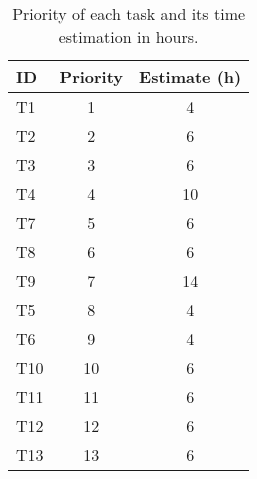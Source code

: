 \begin{table}[h]
\centering
\begin{tabular}{ |l|c|c| } 
 \hline
 \bf{ID} & \bf{Priority} & \bf{Estimate (h)} \\ 
 \hline
 T1 & 1 & 4\\ 
 T2  & 2 & 6\\ 
 T3  & 3 & 6\\ 
 T4  & 4 & 10\\ 
 T7  & 5 & 6\\ 
 T8  & 6 & 6\\ 
 T9  & 7 & 14\\
 T5  & 8 & 4 \\
 T6  & 9 & 4 \\
 T10 & 10 & 6\\ 
 T11  & 11 & 6\\ 
 T12  & 12 & 6\\ 
 T13  & 13 & 6\\ 
 \hline
\end{tabular}
\caption{Priority of each task and its time estimation in hours.}
\label{tab:priorities}
\end{table}